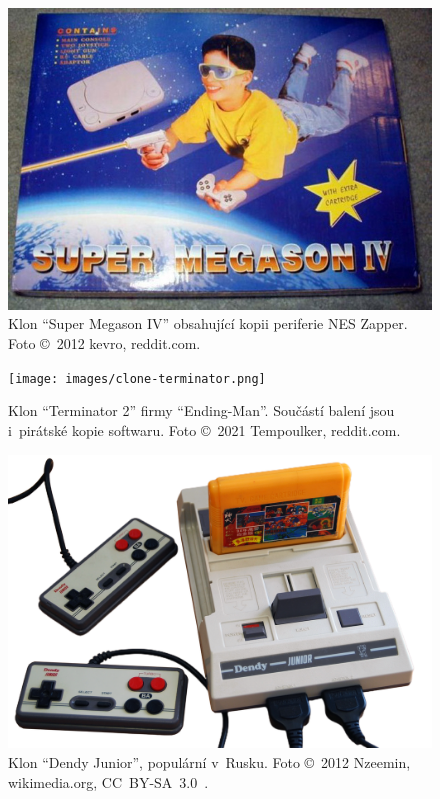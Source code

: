 \begin{figure}[ht!]
	\centering
	\includegraphics[width=0.5\textheight]{images/clone-megason.jpg}
	\caption{Klon \enquote{Super Megason IV} obsahující kopii periferie NES Zapper. Foto \copyright~2012 kevro, reddit.com.}
\end{figure}

\begin{figure}[ht!]
	\centering
	\texttt{[image: images/clone-terminator.png]}
	\caption{Klon \enquote{Terminator 2} firmy \enquote{Ending-Man}. Součástí balení jsou i~pirátské kopie softwaru. Foto \copyright~2021 Tempoulker, reddit.com.}
\end{figure}

\begin{figure}[ht!]
	\centering
	\includegraphics[width=0.5\textheight]{images/clone-dendy.png}
	\caption{Klon \enquote{Dendy Junior}, populární v~Rusku. Foto \copyright~2012 Nzeemin, wikimedia.org, CC~BY-SA~3.0~\cite{Nzeemin:dendy}.}
\end{figure}
